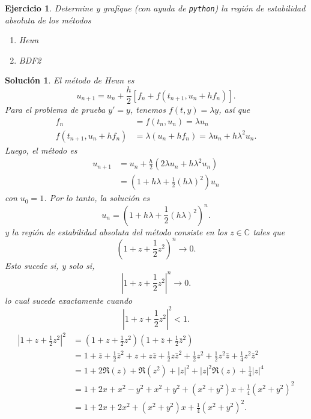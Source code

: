 \documentclass[11pt]{article}
\newtheorem{exercise}{Ejercicio}
\newtheorem*{sol}{Solución}
\newcommand\C{\mathbb C}
\begin{document}
\begin{exercise}
  Determine y grafique (con ayuda de \texttt{python}) la región de
  estabilidad absoluta de los métodos
  \begin{enumerate}
    \item
      Heun
    \item
      BDF2
  \end{enumerate}
\end{exercise}
\begin{sol}
  El método de Heun es
  \begin{equation}
    u_{n+1} = u_n + \frac{h}{2}[f_n + f(t_{n+1},u_n+hf_n)]
  .\end{equation}
  Para el problema de prueba $y'=y$, tenemos $f(t,y)=\lambda y$, así
  que
  \begin{align}
    f_n
      &= f(t_n,u_n)
       = \lambda u_n \\
    f(t_{n+1},u_{n}+hf_n)
      &= \lambda(u_{n}+hf_n)
       = \lambda u_n + h\lambda^{2} u_n
  .\end{align}
  Luego, el método es
  \begin{align}
    u_{n+1}
    &= u_n + \frac{h}{2}(2\lambda u_n + h\lambda^{2} u_n) \\
    &= \left(1 + h\lambda + \frac{1}{2}(h\lambda)^{2}\right) u_n
  \end{align}
  con $u_0=1$.
  Por lo tanto, la solución es
  \begin{equation}
    u_n = \left(1 + h\lambda + \frac{1}{2}(h\lambda)^{2}\right)^{n}
  .\end{equation}
  y la región de estabilidad absoluta del método consiste en los
  $z\in\C$ tales que
  \begin{equation}
    \left(1 + z + \frac{1}{2}z^{2}\right)^{n} \to 0
  .\end{equation}
  Esto sucede si, y solo si, 
  \begin{equation}
    \left|1 + z + \frac{1}{2}z^{2}\right|^{n} \to 0
  .\end{equation}
  lo cual sucede exactamente cuando
  \begin{equation}
    \left|1 + z + \frac{1}{2}z^{2}\right|^{2}<1
  .\end{equation}
  \begin{align}
    \left|1 + z + \frac{1}{2}z^{2}\right|^{2}
    &=
    \left(1 + z + \frac{1}{2}z^{2}\right)
    \left(1 + \bar z + \frac{1}{2}\bar z^{2}\right)
    \\
    &=
    1 + \bar z + \frac{1}{2}\bar z^{2}
    + z + z\bar z + \frac{1}{2}z\bar z^{2}
    + \frac{1}{2}z^{2} + \frac{1}{2}z^{2}\bar z + \frac{1}{4}z^{2}\bar z^{2}
    \\
    &=
    1 + 2\Re(z) + \Re(z^{2})
    + |z|^{2} + |z|^{2}\Re(z)
    + \frac{1}{4}|z|^{4}
    \\
    &=
    1 + 2x + x^{2}-y^{2}
    + x^{2}+y^{2} + (x^{2}+y^{2})x
    + \frac{1}{4}(x^{2}+y^{2})^{2}
    \\
    &=
    1 + 2x + 2x^{2}
    + (x^{2}+y^{2})x
    + \frac{1}{4}(x^{2}+y^{2})^{2}
  .\end{align}
  

\end{sol}
\end{document}
